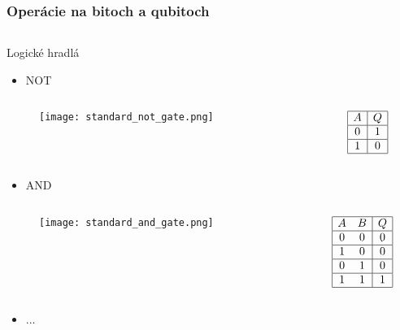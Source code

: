 \documentclass{beamer}
\begin{document}
\begin{frame}
	\frametitle{Operácie na bitoch a qubitoch}
	\begin{columns}[t]
		\begin{column}{.5\textwidth}
			\centering
			Logické hradlá
			\vspace{0.4cm}
			\begin{itemize}
				\item NOT
			\end{itemize}
						     
			\begin{columns}[c]
				\begin{column}{.5\textwidth}
					\begin{figure}
						\texttt{[image: standard\_not\_gate.png]}            
					\end{figure}
				\end{column}
				\begin{column}{.5\textwidth}
					\begin{displaymath}
						\begin{array}{|c|c|}
							\hline
							A & Q \\
							\hline
							0 & 1 \\
							\hline
							1 & 0 \\
							\hline
						\end{array}   
					\end{displaymath}    
				\end{column}
			\end{columns}
			\begin{itemize}
				\item AND
			\end{itemize}
			\begin{columns}[c]
				\begin{column}{.5\textwidth}
					\begin{figure}
						\texttt{[image: standard\_and\_gate.png]}            
					\end{figure}
				\end{column}
				\begin{column}{.5\textwidth}
					\begin{displaymath}
						\begin{array}{|c c|c|}
							\hline
							A & B & Q \\ 
							\hline 
							0 & 0 & 0 \\
							\hline
							1 & 0 & 0 \\
							\hline
							0 & 1 & 0 \\
							\hline
							1 & 1 & 1 \\
							\hline
						\end{array}   
					\end{displaymath}
				\end{column}
			\end{columns}
			\begin{itemize}
				\item ...
			\end{itemize}
						

\end{column}
\end{columns}
\end{frame}
\end{document}
